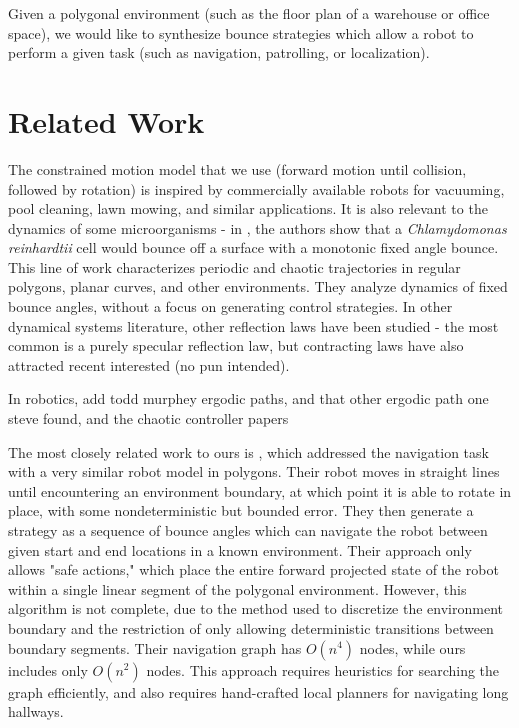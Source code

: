 \documentclass[]{styles/svproc}  %
\begin{document}
Given a polygonal environment (such as the floor plan of a warehouse or office
space), we would like to synthesize bounce strategies which allow a robot to
perform a given task (such as navigation, patrolling, or localization).

\section{Related Work}

The constrained motion model that we use (forward motion until collision,
followed by rotation) is inspired by commercially available robots
for vacuuming, pool cleaning, lawn mowing, and similar applications. It is also
 relevant to the dynamics of some microorganisms - in \cite{microorganism2017}, the authors show that a
\textit{Chlamydomonas reinhardtii} cell would bounce off a surface with a
monotonic fixed angle bounce. This line of work characterizes periodic and
chaotic trajectories in regular polygons, planar curves, and other environments.
They analyze dynamics of fixed bounce angles, without a focus on generating control
strategies.
In other dynamical systems literature, other reflection laws have been studied -
the most common is a purely specular reflection law, but contracting laws have
also attracted recent interested \cite{DelMagno2014,billiards,pinball} (no pun intended).


In robotics, 
{\color{red} add todd murphey ergodic paths, and that other ergodic path one steve
found, and the chaotic controller papers}

The most closely related work to ours is \cite{LewOKa13}, which addressed 
the navigation task with a very similar robot
model in polygons. Their robot moves in straight lines until encountering an environment
boundary, at which point it is able to rotate in place, with some nondeterministic but
bounded error. They then generate a strategy as a sequence of bounce angles which can 
navigate the robot between given start and end locations in a known environment. Their approach only allows "safe actions," which place
the entire forward projected state of the robot within a single
linear segment of the polygonal environment. However, this algorithm is
not complete, due to the method used to discretize the environment boundary and
the restriction of only allowing deterministic transitions between boundary
segments. Their navigation graph has $O(n^4)$ nodes, while ours includes only $O(n^2)$
nodes. This approach requires heuristics for searching the graph efficiently,
and also requires hand-crafted local planners for navigating long hallways.
\end{document}
